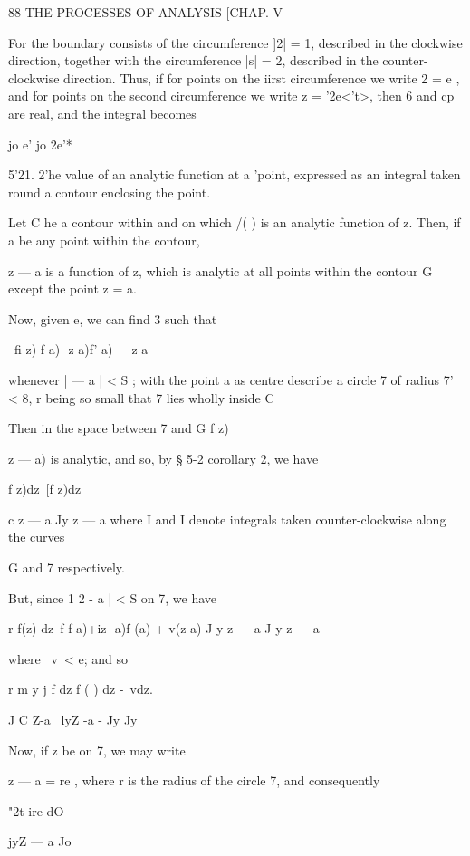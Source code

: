 {  



88 THE PROCESSES OF ANALYSIS [CHAP. V

For the boundary consists of the circumference ]2| = 1, described in
the clockwise direction, together with the circumference |s| = 2,
described in the counter-clockwise direction. Thus, if for points on
the iirst circumference we write 2 = e , and for points on the second
circumference we write z = '2e<'t>, then 6 and cp are real, and the
integral becomes

jo e' jo 2e'*

5'21. 2'he value of an analytic function at a 'point, expressed as an
integral taken round a contour enclosing the point.

Let C he a contour within and on which /( ) is an analytic function of
z. Then, if a be any point within the contour,

z — a is a function of z, which is analytic at all points within the
contour G except the point z = a.

Now, given e, we can find 3 such that

\ fi z)-f a)- z-a)f' a)\ \ \ z-a\

whenever | — a | < S ; with the point a as centre describe a circle 7
of radius 7' < 8, r being so small that 7 lies wholly inside C

Then in the space between 7 and G f z)\ \ {z — a) is analytic, and so,
by § 5-2 corollary 2, we have

f z)dz\ [f z)dz



c z — a Jy z — a where I and I denote integrals taken
counter-clockwise along the curves

G and 7 respectively.

But, since 1 2 - a | < S on 7, we have

r f(z) dz\ f f a)+iz- a)f (a) + v(z-a) J y z — a J y z — a

where \ v\ < e; and so

r m y j f dz f ( ) dz -\ vdz.

J C Z-a \ lyZ -a - Jy Jy

Now, if z be on 7, we may write

z — a = re , where r is the radius of the circle 7, and consequently

"2t ire dO



jyZ — a Jo



}}
